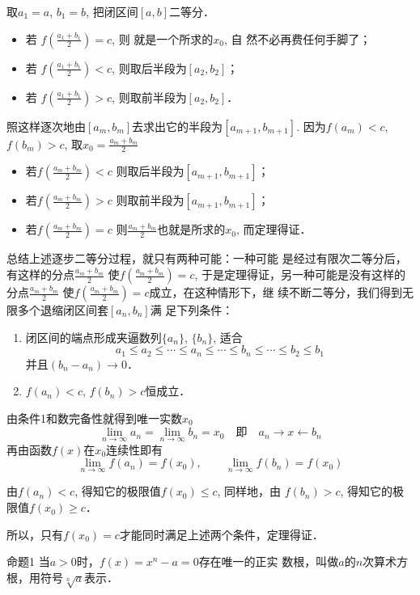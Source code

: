 取$a_1=a$, $b_1=b$, 把闭区间$[a,b]$二等分．
\begin{itemize}
    \item 若
$f\left(\frac{a_1+b_1}{2}\right)=c$, 则
就是一个所求的$x_0$, 自
然不必再费任何手脚了；
\item 若
$f\left(\frac{a_1+b_1}{2}\right)<c$,
则取后半段为$[a_2,b_2]$；
\item 若
$f\left(\frac{a_1+b_1}{2}\right)>c$,
则取前半段为$[a_2,b_2]$．
\end{itemize}
照这样逐次地由$[a_m,b_m]$去求出它的半段为$[a_{m+1},b_{m+1}]$.
因为$f(a_m)<c$, $f(b_m)>c$, 取$x_0=\frac{a_m+b_m}{2}$
\begin{itemize}
    \item 若$f\left(\frac{a_m+b_m}{2}\right)<c$
则取后半段为$[a_{m+1},b_{m+1}]$；
\item 若$f\left(\frac{a_m+b_m}{2}\right)>c$
则取前半段为$[a_{m+1},b_{m+1}]$；
\item 若$f\left(\frac{a_m+b_m}{2}\right)=c$
则$\frac{a_{m}+b_{m}}{2}$也就是所求的$x_0$, 
而定理得证．
\end{itemize}

总结上述逐步二等分过程，就只有两种可能：一种可能
是经过有限次二等分后，有这样的分点$\frac{a_m+b_m}{2}$
使$f\left(\frac{a_m+b_m}{2}\right)=c$, 于是定理得证，另一种可能是没有这样的
分点$\frac{a_m+b_m}{2}$
使$f\left(\frac{a_m+b_m}{2}\right)=c$成立，在这种情形下，继
续不断二等分，我们得到无限多个退缩闭区间套$[a_n,b_n]$满
足下列条件：

\begin{enumerate}
    \item 闭区间的端点形成夹逼数列$\{a_n\}$, $\{b_n\}$, 适合
    \[a_1\le a_2\le \cdots\le a_n\le \cdots \le b_n\le \cdots\le b_2\le b_1\]
并且$(b_n-a_n)\to 0$．
    \item $f(a_n)<c$, $f(b_n)>c$恒成立．

\end{enumerate}

    由条件1和数完备性就得到唯一实数$x_0$
    \[\lim_{n\to\infty} a_n=\lim_{n\to\infty} b_n=x_0\quad \text{即}\quad a_n\to x\leftarrow b_n\]
    再由函数$f(x)$在$x_0$连续性即有
\[    \lim_{n\to\infty} f(a_n) = f(x_0),\qquad \lim_{n\to\infty} f(b_n)=f(x_0)\]

由$f(a_n)<c$, 得知它的极限值$f(x_0)\le c$, 同样地，由
    $f(b_n)>c$, 得知它的极限值$f(x_0)\ge c$．

所以，只有$f(x_0)=c$才能同时满足上述两个条件，定理得证．


\begin{blk}{命题1}
    当$a>0$时，$f(x)=x^n-a=0$存在唯一的正实
    数根，叫做$a$的$n$次算术方根，用符号$\sqrt[n]{a}$表示．
\end{blk}

